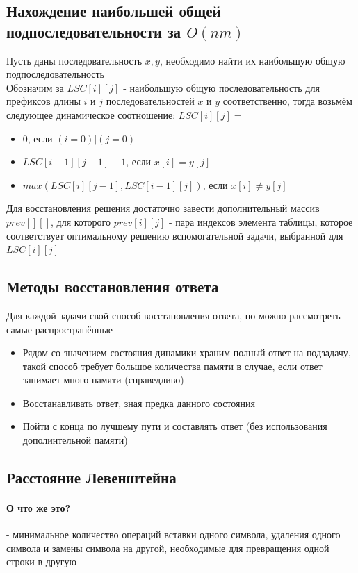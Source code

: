 \documentclass[a4paper,10pt]{article}
\begin{document}
\subsection{Нахождение наибольшей общей подпоследовательности за $O(nm)$}
Пусть даны последовательность $x, y$, необходимо найти их наибольшую общую подпоследовательность \\
Обозначим за $LSC[i][j]$ - наибольшую общую последовательность для префиксов длины $i$ и $j$ последовательностей $x$ и $y$ соответственно, тогда возьмём следующее динамическое соотношение: $LSC[i][j] = $
\begin{itemize}
	\item $0$, если $(i = 0) | (j = 0)$
	\item $LSC[i-1][j-1] + 1$, если $x[i] = y[j]$
	\item $max(LSC[i][j-1], LSC[i-1][j])$, если $x[i] \neq y[j]$
\end{itemize}
Для восстановления решения достаточно завести дополнительный массив $prev[][]$, для которого $prev[i][j]$ - пара индексов элемента таблицы, которое соответствует оптимальному решению вспомогательной задачи, выбранной для $LSC[i][j]$\\
\subsection{Методы восстановления ответа}
Для каждой задачи свой способ восстановления ответа, но можно рассмотреть самые распространённые
\begin{itemize}
	\item Рядом со значением состояния динамики храним полный ответ на подзадачу, такой способ требует большое количества памяти в случае, если ответ занимает много памяти (справедливо)
	\item Восстанавливать ответ, зная предка данного состояния 
	\item Пойти с конца по лучшему пути и составлять ответ (без использования дополинтельной памяти)
\end{itemize}
\subsection{Расстояние Левенштейна}
\paragraph{О что же это?} - минимальное количество операций вставки одного символа, удаления одного символа и замены символа на другой, необходимые для превращения одной строки в другую \\
\end{document}
